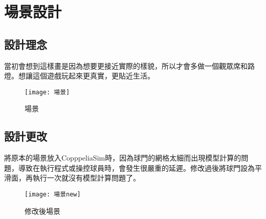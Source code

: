\chapter{場景設計}
\section{設計理念}
 當初會想到這樣畫是因為想要更接近實際的樣貌，所以才會多做一個觀眾席和路燈。想讓這個遊戲玩起來更真實，更貼近生活。\\[6pt]
\begin{figure}[hbt!]
\begin{center}
\texttt{[image: 場景]}
\caption{\Large 場景}\label{場景}
\end{center}
\end{figure} 

\section{設計更改}

將原本的場景放入CopppeliaSim時，因為球門的網格太細而出現模型計算的問題，導致在執行程式或操控球員時，會發生很嚴重的延遲。修改過後將球門設為平滑面，再執行一次就沒有模型計算問題了。\\[6pt]

\begin{figure}[hbt!]
\begin{center}
\texttt{[image: 場景new]}
\caption{\Large 修改後場景}\label{場景new}
\end{center}
\end{figure} 

\newpage